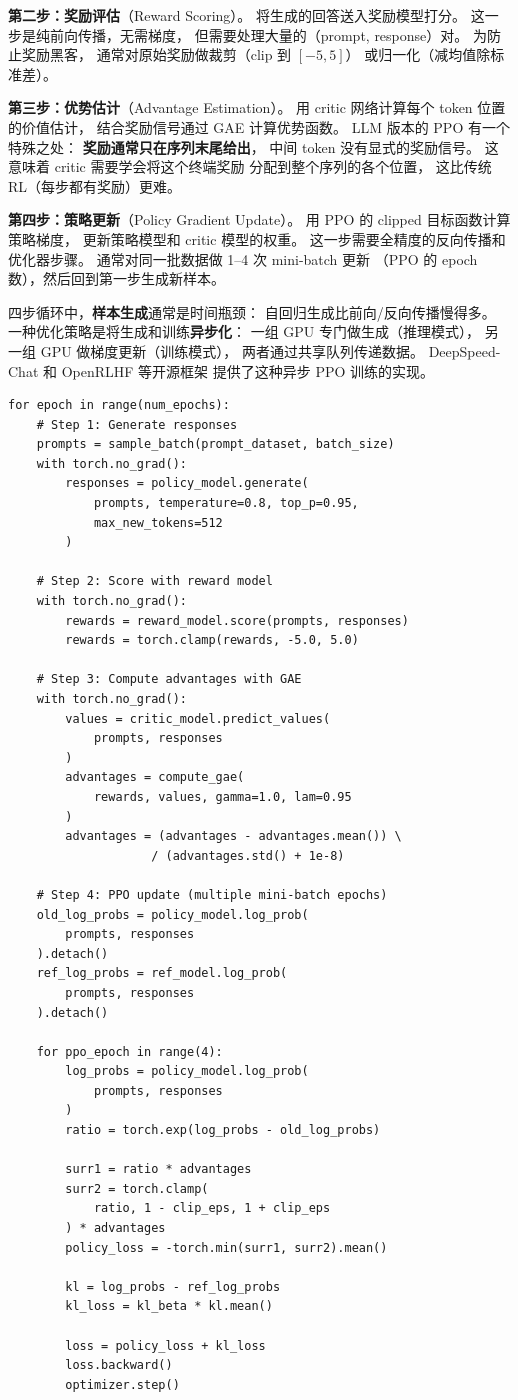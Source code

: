 \textbf{第二步：奖励评估}（Reward Scoring）。
将生成的回答送入奖励模型打分。
这一步是纯前向传播，无需梯度，
但需要处理大量的（prompt, response）对。
为防止奖励黑客，
通常对原始奖励做裁剪（clip 到 $[-5, 5]$）
或归一化（减均值除标准差）。

\textbf{第三步：优势估计}（Advantage Estimation）。
用 critic 网络计算每个 token 位置的价值估计，
结合奖励信号通过 GAE 计算优势函数。
LLM 版本的 PPO 有一个特殊之处：
\textbf{奖励通常只在序列末尾给出}，
中间 token 没有显式的奖励信号。
这意味着 critic 需要学会将这个终端奖励
分配到整个序列的各个位置，
这比传统 RL（每步都有奖励）更难。

\textbf{第四步：策略更新}（Policy Gradient Update）。
用 PPO 的 clipped 目标函数计算策略梯度，
更新策略模型和 critic 模型的权重。
这一步需要全精度的反向传播和优化器步骤。
通常对同一批数据做 1--4 次 mini-batch 更新
（PPO 的 epoch 数），然后回到第一步生成新样本。

四步循环中，\textbf{样本生成}通常是时间瓶颈：
自回归生成比前向/反向传播慢得多。
一种优化策略是将生成和训练\textbf{异步化}：
一组 GPU 专门做生成（推理模式），
另一组 GPU 做梯度更新（训练模式），
两者通过共享队列传递数据。
DeepSpeed-Chat 和 OpenRLHF 等开源框架
提供了这种异步 PPO 训练的实现。

\begin{lstlisting}[caption={RLHF PPO training loop (high-level)}]
for epoch in range(num_epochs):
    # Step 1: Generate responses
    prompts = sample_batch(prompt_dataset, batch_size)
    with torch.no_grad():
        responses = policy_model.generate(
            prompts, temperature=0.8, top_p=0.95,
            max_new_tokens=512
        )

    # Step 2: Score with reward model
    with torch.no_grad():
        rewards = reward_model.score(prompts, responses)
        rewards = torch.clamp(rewards, -5.0, 5.0)

    # Step 3: Compute advantages with GAE
    with torch.no_grad():
        values = critic_model.predict_values(
            prompts, responses
        )
        advantages = compute_gae(
            rewards, values, gamma=1.0, lam=0.95
        )
        advantages = (advantages - advantages.mean()) \
                    / (advantages.std() + 1e-8)

    # Step 4: PPO update (multiple mini-batch epochs)
    old_log_probs = policy_model.log_prob(
        prompts, responses
    ).detach()
    ref_log_probs = ref_model.log_prob(
        prompts, responses
    ).detach()

    for ppo_epoch in range(4):
        log_probs = policy_model.log_prob(
            prompts, responses
        )
        ratio = torch.exp(log_probs - old_log_probs)

        surr1 = ratio * advantages
        surr2 = torch.clamp(
            ratio, 1 - clip_eps, 1 + clip_eps
        ) * advantages
        policy_loss = -torch.min(surr1, surr2).mean()

        kl = log_probs - ref_log_probs
        kl_loss = kl_beta * kl.mean()

        loss = policy_loss + kl_loss
        loss.backward()
        optimizer.step()
\end{lstlisting}

